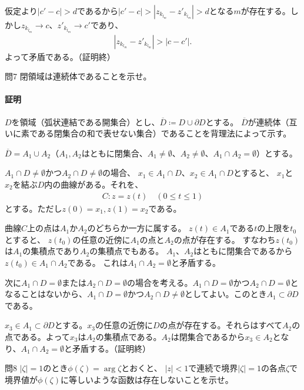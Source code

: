 仮定より$|c'-c|>d$であるから$|c'-c|>|z_{k_{l_m}}-z'_{k_{l_m}}|>d$となる$m$が存在する。しかし$z_{k_{l_m}}\longrightarrow c$、$z'_{k_{l_m}}\longrightarrow c'$であり、
\begin{align*}
    |z_{k_{l_m}}-z'_{k_{l_m}}|>|c-c'|.
\end{align*}
よって矛盾である。（証明終）

\begin{mysimplebox}{問7}
    閉領域は連続体であることを示せ。
\end{mysimplebox}
\paragraph{証明}
$D$を領域（弧状連結である開集合）とし、$\overline{D}\coloneqq D\cup\partial D$とする。
$\overline{D}$が連続体（互いに素である閉集合の和で表せない集合）であることを背理法によって示す。

$\overline{D}=A_1\cup A_2$（$A_1, A_2$はともに閉集合、$A_1\neq\emptyset$、$A_2\neq\emptyset$、$A_1\cap A_2=\emptyset$）とする。

$A_1\cap D\neq\emptyset$かつ$A_2\cap D\neq\emptyset$の場合、
$x_1\in A_1\cap D$、$x_2\in A_1\cap D$とすると、
$x_1$と$x_2$を結ぶ$D$内の曲線がある。それを、
\begin{align*}
    C\colon z=z(t)\quad (0\le t \le 1)
\end{align*}
とする。ただし$z(0)=x_1, z(1)=x_2$である。

曲線$C$上の点は$A_1$か$A_2$のどちらか一方に属する。
$z(t)\in A_1$である$t$の上限を$t_0$とすると、
$z(t_0)$の任意の近傍に$A_1$の点と$A_2$の点が存在する。
すなわち$z(t_0)$は$A_1$の集積点であり$A_2$の集積点でもある。
$A_1$、$A_2$はともに閉集合であるから$z(t_0)\in A_1\cap A_2$である。
これは$A_1\cap A_2=\emptyset$と矛盾する。

次に$A_1\cap D=\emptyset$または$A_2\cap D=\emptyset$の場合を考える。$A_1\cap D=\emptyset$かつ$A_2\cap D=\emptyset$となることはないから、$A_1\cap D=\emptyset$かつ$A_2\cap D\neq\emptyset$としてよい。このとき$A_1\subset\partial D$である。

$x_3\in A_1\subset\partial D$とする。$x_3$の任意の近傍に$D$の点が存在する。それらはすべて$A_2$の点である。よって$x_3$は$A_2$の集積点である。$A_2$は閉集合であるから$x_3\in A_2$となり、$A_1\cap A_2=\emptyset$と矛盾する。（証明終）

\begin{mysimplebox}{問8}
    $|\zeta|=1$のとき$\phi(\zeta)=\arg \zeta$とおくと、
    $|z|<1$で連続で境界$|\zeta|=1$の各点$\zeta$で境界値が$\phi(\zeta)$に等しいような函数は存在しないことを示せ。
\end{mysimplebox}
